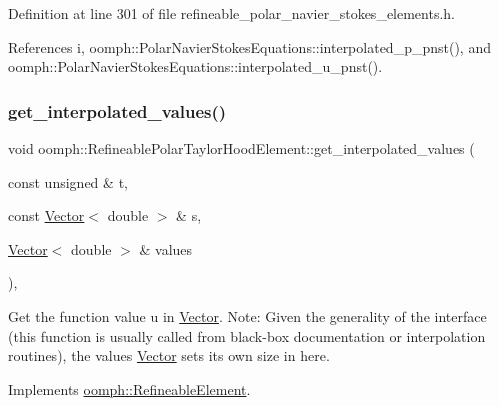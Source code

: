 Definition at line 301 of file refineable\+\_\+polar\+\_\+navier\+\_\+stokes\+\_\+elements.\+h.



References i, oomph\+::\+Polar\+Navier\+Stokes\+Equations\+::interpolated\+\_\+p\+\_\+pnst(), and oomph\+::\+Polar\+Navier\+Stokes\+Equations\+::interpolated\+\_\+u\+\_\+pnst().

\mbox{\label{classoomph_1_1RefineablePolarTaylorHoodElement_aef7e50cfaa3725eb0b6ae5268f2d1ed8}} 
\subsubsection{\texorpdfstring{get\+\_\+interpolated\+\_\+values()}{get\_interpolated\_values()}\hspace{0.1cm}{\footnotesize\ttfamily [2/2]}}
{\footnotesize\ttfamily void oomph\+::\+Refineable\+Polar\+Taylor\+Hood\+Element\+::get\+\_\+interpolated\+\_\+values (\begin{DoxyParamCaption}\item[{const unsigned \&}]{t,  }\item[{const \hyperlink{classoomph_1_1Vector}{Vector}$<$ double $>$ \&}]{s,  }\item[{\hyperlink{classoomph_1_1Vector}{Vector}$<$ double $>$ \&}]{values }\end{DoxyParamCaption})\hspace{0.3cm}{\ttfamily [inline]}, {\ttfamily [virtual]}}



Get the function value u in \hyperlink{classoomph_1_1Vector}{Vector}. Note\+: Given the generality of the interface (this function is usually called from black-\/box documentation or interpolation routines), the values \hyperlink{classoomph_1_1Vector}{Vector} sets its own size in here. 



Implements \hyperlink{classoomph_1_1RefineableElement_ada6f0efe831ffefb1d2829ce01d45bfc}{oomph\+::\+Refineable\+Element}.



